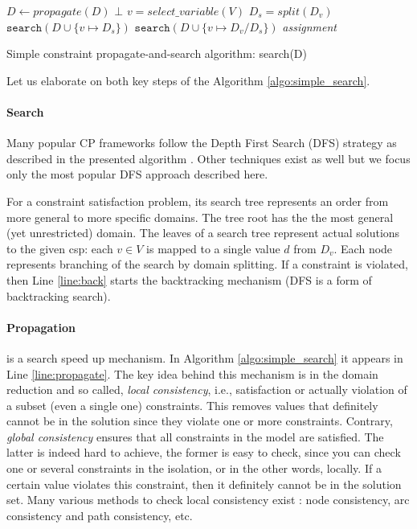 \begin{algorithm}[t]
    \begin{algorithmic}[1]
        \footnotesize
        \State $D \gets \textit{propagate}(D)$ \label{line:propagate}
         \label{line:back}
        \State \Return $\bot$
        \EndIf
        \State $v = \textit{select\_variable}(V)$ 
        \State $D_s = \textit{split}(D_v)$  
        \State $\texttt{search}(D \cup \{ v \mapsto D_s \})$ 
        \State $\texttt{search}(D \cup \{ v \mapsto D_v / D_s \})$
        \Else
        \State \Return \textit{assignment}
        \EndIf
    \end{algorithmic}
    \caption{Simple constraint propagate-and-search algorithm: search(D)}
    \label{algo:simple_search}
\end{algorithm}

\pubrev
Let us elaborate on both key steps of the Algorithm \ref{algo:simple_search}.
\paragraph{Search} Many popular CP frameworks follow the Depth First Search (DFS) strategy as described in the presented algorithm \parencite{cp_propagation,handbookcp}. Other techniques exist as well \parencite{other_search_CP} but we focus only the most popular DFS approach described here.

For a constraint satisfaction problem, its search tree represents an order from more general to more specific domains. The tree root has the the most general (yet unrestricted) domain. The leaves of a search tree represent actual solutions to the given \acrshort{csp}: each $v \in V$ is mapped to a single value $d$ from $D_v$. Each node represents branching of the search by domain splitting. If a constraint is violated, then Line \ref{line:back} starts the backtracking mechanism (DFS is a form of backtracking search).

\paragraph{Propagation} is a search speed up mechanism. In Algorithm \ref{algo:simple_search} it appears in Line \ref{line:propagate}. The key idea behind this mechanism is in the domain reduction and so called, \textit{local consistency}, i.e., satisfaction or actually violation of a subset (even a single one) constraints. This removes values that definitely cannot be in the solution since they violate one or more constraints. Contrary, \textit{global consistency} ensures that all constraints in the model are satisfied. The latter is indeed hard to achieve, the former is easy to check, since you can check one or several constraints in the isolation, or in the other words, locally. If a certain value violates this constraint, then it definitely cannot be in the solution set. Many various methods to check local consistency exist \parencite{cp_christian_local_consistency}: node consistency, arc consistency and path consistency, etc.

